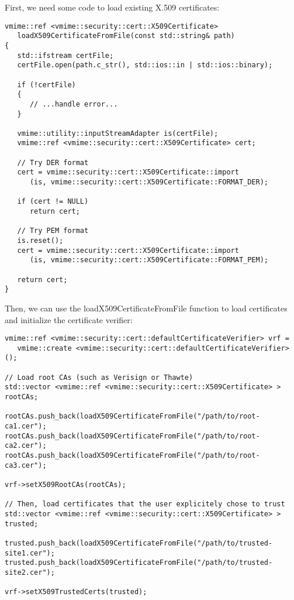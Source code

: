First, we need some code to load existing X.509 certificates:

\begin{lstlisting}[caption={Reading a X.509 certificate from a file}]
vmime::ref <vmime::security::cert::X509Certificate>
   loadX509CertificateFromFile(const std::string& path)
{
   std::ifstream certFile;
   certFile.open(path.c_str(), std::ios::in | std::ios::binary);

   if (!certFile)
   {
      // ...handle error...
   }

   vmime::utility::inputStreamAdapter is(certFile);
   vmime::ref <vmime::security::cert::X509Certificate> cert;

   // Try DER format
   cert = vmime::security::cert::X509Certificate::import
      (is, vmime::security::cert::X509Certificate::FORMAT_DER);

   if (cert != NULL)
      return cert;

   // Try PEM format
   is.reset();
   cert = vmime::security::cert::X509Certificate::import
      (is, vmime::security::cert::X509Certificate::FORMAT_PEM);

   return cert;
}
\end{lstlisting}

Then, we can use the {\vcode loadX509CertificateFromFile} function to load
certificates and initialize the certificate verifier:

\begin{lstlisting}[caption={Using the default certificate verifier}]
vmime::ref <vmime::security::cert::defaultCertificateVerifier> vrf =
   vmime::create <vmime::security::cert::defaultCertificateVerifier>();

// Load root CAs (such as Verisign or Thawte)
std::vector <vmime::ref <vmime::security::cert::X509Certificate> > rootCAs;

rootCAs.push_back(loadX509CertificateFromFile("/path/to/root-ca1.cer");
rootCAs.push_back(loadX509CertificateFromFile("/path/to/root-ca2.cer");
rootCAs.push_back(loadX509CertificateFromFile("/path/to/root-ca3.cer");

vrf->setX509RootCAs(rootCAs);

// Then, load certificates that the user explicitely chose to trust
std::vector <vmime::ref <vmime::security::cert::X509Certificate> > trusted;

trusted.push_back(loadX509CertificateFromFile("/path/to/trusted-site1.cer");
trusted.push_back(loadX509CertificateFromFile("/path/to/trusted-site2.cer");

vrf->setX509TrustedCerts(trusted);
\end{lstlisting}


